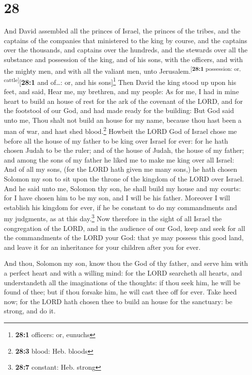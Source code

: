 \hypertarget{section-27}{%
\section{28}\label{section-27}}

 And David assembled all the princes of Israel, the
princes of the tribes, and the captains of the companies that ministered
to the king by course, and the captains over the thousands, and captains
over the hundreds, and the stewards over all the substance and
possession of the king, and of his sons, with the officers, and with the
mighty men, and with all the valiant men, unto
Jerusalem.\textsuperscript{{[}\textbf{28:1} possession: or,
cattle{]}}{[}\textbf{28:1} and of\ldots: or, and his sons{]}\footnote{\textbf{28:1}
  officers: or, eunuchs}  Then David the king stood up
upon his feet, and said, Hear me, my brethren, and my people: As for me,
I had in mine heart to build an house of rest for the ark of the
covenant of the LORD, and for the footstool of our God, and had made
ready for the building:  But God said unto me, Thou shalt
not build an house for my name, because thou hast been a man of war, and
hast shed blood.\footnote{\textbf{28:3} blood: Heb. bloods}
 Howbeit the LORD God of Israel chose me before all the
house of my father to be king over Israel for ever: for he hath chosen
Judah to be the ruler; and of the house of Judah, the house of my
father; and among the sons of my father he liked me to make me king over
all Israel:  And of all my sons, (for the LORD hath given
me many sons,) he hath chosen Solomon my son to sit upon the throne of
the kingdom of the LORD over Israel.  And he said unto me,
Solomon thy son, he shall build my house and my courts: for I have
chosen him to be my son, and I will be his father. 
Moreover I will establish his kingdom for ever, if he be constant to do
my commandments and my judgments, as at this day.\footnote{\textbf{28:7}
  constant: Heb. strong}  Now therefore in the sight of
all Israel the congregation of the LORD, and in the audience of our God,
keep and seek for all the commandments of the LORD your God: that ye may
possess this good land, and leave it for an inheritance for your
children after you for ever.

 And thou, Solomon my son, know thou the God of thy
father, and serve him with a perfect heart and with a willing mind: for
the LORD searcheth all hearts, and understandeth all the imaginations of
the thoughts: if thou seek him, he will be found of thee; but if thou
forsake him, he will cast thee off for ever.  Take heed
now; for the LORD hath chosen thee to build an house for the sanctuary:
be strong, and do it.

